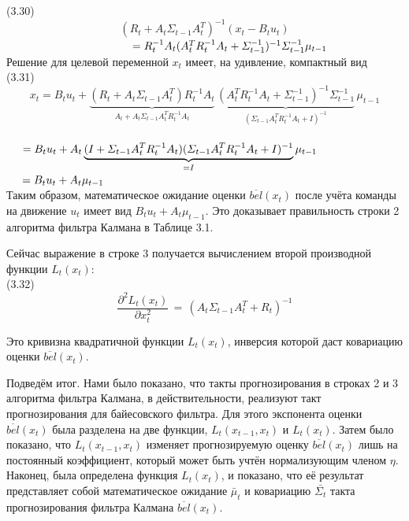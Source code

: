 \documentclass[10pt,a4paper]{article}
\begin{document}
(3.30)
$$(R_t+A_t\varSigma_{t-1}A_t^T)^{-1}(x_t-B_t u_t)$$
$\hspace{40mm}=R_t^{-1}A_t(A_t^T R_t^{-1}A_t+\varSigma_{t-1}^{-1})^{-1}\varSigma_{t-1}^{-1}\mu_{t-1}$\\

Решение для целевой переменной $x_t$ имеет, на удивление, компактный вид\\

(3.31)
$$x_t=B_t u_t+\underbrace{(R_t+A_t\varSigma_{t-1}A_t^T)R_t^{-1}A_t}_{A_t+A_t\varSigma_{t-1}A_t^T R_t^{-1}A_t}\,\underbrace{(A_t^T R_t^{-1}A_t+\varSigma_{t-1}^{-1})^{-1}\varSigma_{t-1}^{-1}}_{(\varSigma_{t-1}A_t^T R_t^{-1}A_t+I)^{-1}}\,\mu_{t-1}$$\\

$\hspace{5mm}=B_t u_t+A_t\underbrace{(I+\varSigma_{t-1}A_t^T R_t^{-1}A_t)(\varSigma_{t-1}A_t^T R_t^{-1}A_t+I)^{-1}}_{=I}\mu_{t-1}$\\

$\hspace{5mm}=B_t u_t+A_t\mu_{t-1}$\\

Таким образом, математическое ожидание оценки $\overline{bel}(x_t)$ после учёта команды на движение $u_t$ имеет вид $B_t u_t+A_t\mu_{t-1}$. Это доказывает правильность строки 2 алгоритма фильтра Калмана в Таблице 3.1.

Сейчас выражение в строке 3 получается вычислением второй производной функции $L_t(x_t)$:\\

(3.32)
$$\frac{\partial^2 L_t(x_t)}{\partial x_t^2}\,=\,(A_t\varSigma_{t-1}A_t^T+R_t)^{-1}$$

Это кривизна квадратичной функции $L_t(x_t)$, инверсия которой даст ковариацию оценки $\overline{bel}(x_t)$.

Подведём итог. Нами было показано, что такты прогнозирования в строках 2 и 3 алгоритма фильтра Калмана, в действительности, реализуют такт прогнозирования для байесовского фильтра. Для этого экспонента оценки  $\overline{bel}(x_t)$ была разделена на две функции, $L_t(x_{t-1},x_t)$ и $L_t(x_t)$. Затем было показано, что $L_t(x_{t-1},x_t)$ изменяет прогнозируемую оценку $\overline{bel}(x_t)$ лишь на постоянный коэффициент, который может быть учтён нормализующим членом $\eta$. Наконец, была определена функция $L_t(x_t)$, и показано, что её результат представляет собой математическое ожидание $\bar{\mu}_t$ и ковариацию $\bar{\varSigma_t}$ такта прогнозирования фильтра Калмана $\overline{bel}(x_t)$.\\
\end{document}

